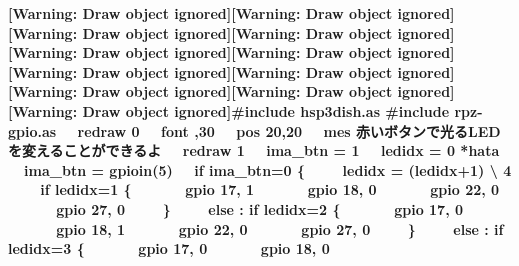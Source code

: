 \documentclass[a4paper,dvipdfmx]{jarticle}
\begin{document}
{\ttfamily\bfseries
[Warning: Draw object ignored][Warning: Draw object ignored][Warning: Draw object ignored][Warning: Draw object
ignored][Warning: Draw object ignored][Warning: Draw object ignored][Warning: Draw object ignored][Warning: Draw object
ignored][Warning: Draw object ignored][Warning: Draw object ignored][Warning: Draw object ignored]\#include
{\textquotedbl}hsp3dish.as{\textquotedbl}\newline
\#include {\textquotedbl}rpz-gpio.as{\textquotedbl}\newline
\newline
\ \ redraw 0\newline
\ \ font {\textquotedbl}{\textquotedbl},30\newline
\ \ pos 20,20\newline
\ \ mes
{\textquotedbl}赤いボタンで光るLEDを変えることができるよ{\textquotedbl}\newline
\ \ redraw 1\newline
\newline
\ \ ima\_btn = 1\newline
\ \ ledidx = 0\newline
\newline
*hata\newline
\ \ ima\_btn = gpioin(5)\newline
\ \ if ima\_btn=0 \{\newline
\ \ \ \ ledidx = (ledidx+1) {\textbackslash} 4\newline
\newline
\ \ \ \ if ledidx=1 \{\newline
\ \ \ \ \ \ gpio 17, 1\newline
\ \ \ \ \ \ gpio 18, 0\newline
\ \ \ \ \ \ gpio 22, 0\newline
\ \ \ \ \ \ gpio 27, 0\newline
\ \ \ \ \}\newline
\ \ \ \ else : if ledidx=2 \{\newline
\ \ \ \ \ \ gpio 17, 0\newline
\ \ \ \ \ \ gpio 18, 1\newline
\ \ \ \ \ \ gpio 22, 0\newline
\ \ \ \ \ \ gpio 27, 0\newline
\ \ \ \ \}\newline
\ \ \ \ else : if ledidx=3 \{\newline
\ \ \ \ \ \ gpio 17, 0\newline
\ \ \ \ \ \ gpio 18, 0\newline
}
\end{document}
